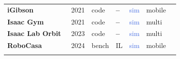\documentclass[acmsmall,review,anonymous]{acmart}
\newcommand{\nn}{\textcolor{BrickRed}{\ding{56}}}         %
\newcommand{\dm}{\textcolor{gray!65}{\textbf{--}}}         %
\newcommand{\dsim}{\textcolor{RoyalBlue}{\textsf{sim}}}
\begin{document}
{\begin{longtable}{@{}p{} c l l c l c@{}}
\hspace{0.6em}\textbf{iGibson}~\cite{igibson} & 2021 & \textsf{code} & \dm & \dsim & \textsf{mobile} & \nn\\
\hspace{0.6em}\textbf{Isaac Gym}~\cite{isaacgym} & 2021 & \textsf{code} & \dm & \dsim & \textsf{multi} & \nn\\
\hspace{0.6em}\textbf{Isaac Lab Orbit}~\cite{orbit} & 2023 & \textsf{code} & \dm & \dsim & \textsf{multi} & \nn\\
\hspace{0.6em}\textbf{RoboCasa}~\cite{robocasa} & 2024 & \textsf{bench} & \textsf{IL} & \dsim & \textsf{mobile} & \nn\\
\addlinespace[2pt]
\end{longtable}
}
  
\end{document}
